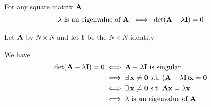 \begin{frame}
    
    \vspace{2em}
    \Fact{\eqref{ET-fa:chei}} For any square matrix $\mathbf A$ 
    \begin{equation*}
        \lambda \text{ is an eigenvalue of } \mathbf A \; \iff \;
        \det(\mathbf A - \lambda \mathbf I) = 0
    \end{equation*}

    \vspace{1em}

    \Prf  Let $\mathbf A$ by $N \times N$ and let $\mathbf I$ be the $N \times N$
    identity

    We have
    \begin{align*}
        \det(\mathbf A - \lambda \mathbf I) = 0
        & \iff \mathbf A - \lambda \mathbf I \text{ is singular}
        \\
        & \iff \exists \, {\mathbf x} \not= {\mathbf 0} \ \mathrm{s.t.}\ 
            (\mathbf A - \lambda \mathbf I) {\mathbf x} = {\mathbf 0}
        \\
        & \iff \exists \, {\mathbf x} \not= {\mathbf 0} \ \mathrm{s.t.}\ 
        \mathbf A {\mathbf x} = \lambda {\mathbf x}
        \\
        & \iff \lambda 
        \text{ is an eigenvalue of } \mathbf A
    \end{align*}

\end{frame}


